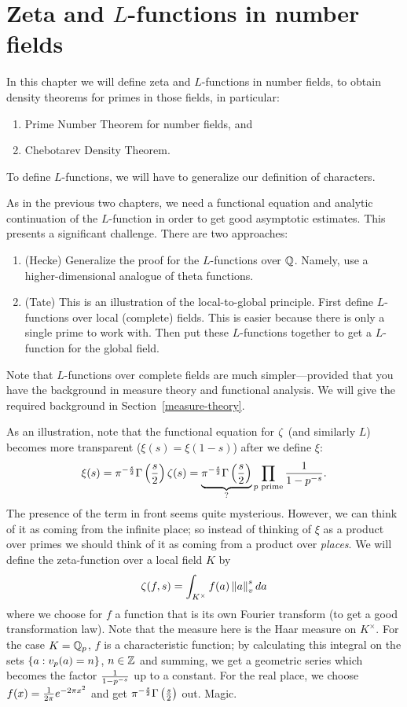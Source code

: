 \chapter{Zeta and $L$-functions in number fields}
In this chapter we will define zeta and $L$-functions in number fields, to obtain density theorems for primes in those fields, in particular:
\begin{enumerate}
\item
Prime Number Theorem for number fields, and
\item
Chebotarev Density Theorem.
\end{enumerate}
To define $L$-functions, we will have to generalize our definition of characters.

As in the previous two chapters, we need a functional equation and analytic continuation of the $L$-function in order to get good asymptotic estimates. This presents a significant challenge. There are two approaches:
\begin{enumerate}
\item (Hecke) Generalize the proof for the $L$-functions over $\mathbb{Q}$. Namely, use a higher-dimensional analogue of theta functions.
\item (Tate) This is an illustration of the local-to-global principle. First define $L$-functions over local (complete) fields. This is easier because there is only a single prime to work with.
Then put these $L$-functions together to get a $L$-function for the global field.
\end{enumerate}
Note that $L$-functions over complete fields are much simpler---provided that you have the background in measure theory and functional analysis. We will give the required background in Section~\ref{measure-theory}.

As an illustration, note that the functional equation for $\zeta$ (and similarly $L$) becomes more transparent ($\xi(s)=\xi(1-s)$) after we define $\xi$:
\[
\xi(s)=\pi^{-\frac{s}{2}}\Gamma\left( {\frac{s}{2}} \right)\zeta(s)=\underbrace{\pi^{-\frac{s}{2}} \Gamma\left( {\frac{s}{2}} \right)}_{?} \prod_{p\text{ prime}}\frac{1}{1-p^{-s}}.
\]
The presence of the term in front seems quite mysterious. However, we can think of it as coming from the infinite place; so instead of thinking of $\xi$ as a product over primes we should think of it as coming from a product over {\it places}.  We will define the zeta-function over a local field $K$ by
\[
\zeta(f,s)=\int_{K^{\times}} f(a)\left\Vert {a}\right\Vert_v^s da
\]
where we choose for $f$ a function that is its own Fourier transform (to get a good transformation law). 
Note that the measure here is the Haar measure on $K^{\times}$. For the case $K=\mathbb{Q}_p$, $f$ is a characteristic function; by calculating this integral on the sets $\left\{{a}:{v_p(a)=n}\right\}$, $n\in \mathbb{Z}$ and summing, we get a geometric series which becomes the factor $\frac{1}{1-p^{-s}}$ up to a constant. For the real place, we choose $f(x)=\frac{1}{2\pi} e^{-2\pi x^2}$ and get $\pi^{-\frac{s}{2}} \Gamma\left( {\frac{s}{2}} \right)$ out. Magic.
